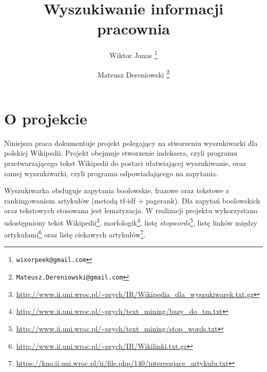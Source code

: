 \documentclass[a4paper,12pt]{article}
\title{\textbf{Wyszukiwanie informacji} \\ pracownia}
\author{
Wiktor Janas \thanks{\texttt{wixorpeek@gmail.com}}
\and
Mateusz Dereniowski \thanks{\texttt{Mateusz.Dereniowski@gmail.com}}}
\begin{document}
\maketitle
\thispagestyle{empty}

\tableofcontents

\newpage

\section{O projekcie}
Niniejsza praca dokumentuje projekt polegający na stworzeniu wyszukiwarki dla
polskiej Wikipedii. Projekt obejmuje stworzenie indeksera, czyli programu
przetwarzającego tekst Wikipedii do postaci ułatwiającej wyszukiwanie, oraz
samej wyszukiwarki, czyli programu odpowiadającego na zapytania.

Wyszukiwarka obsługuje zapytania boolowskie, frazowe oraz tekstowe z rankingowaniem
artykułów (metodą tf-idf + pagerank). Dla zapytań boolowskich oraz tekstowych
stosowana jest lematyzacja. W realizacji projektu wykorzystano udostępniony
tekst Wikipedii\footnote{\url{http://www.ii.uni.wroc.pl/~prych/IR/Wikipedia_dla_wyszukiwarek.txt.gz}},
morfologik\footnote{\url{http://www.ii.uni.wroc.pl/~prych/text_mining/bazy_do_tm.txt}},
listę \textit{stopwords}\footnote{\url{http://www.ii.uni.wroc.pl/~prych/text_mining/stop_words.txt}},
listę linków między artykułami\footnote{\url{http://www.ii.uni.wroc.pl/~prych/IR/Wikilinki.txt.gz}}
oraz listę ciekawych artykułów\footnote{\url{https://kno.ii.uni.wroc.pl/ii/file.php/140/interesujace_artykulu.txt}}.
\end{document}
